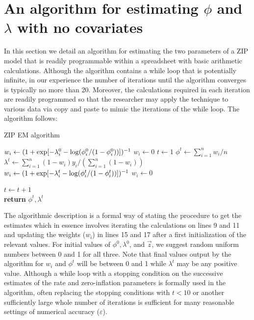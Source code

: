 \documentclass{article}
\begin{document}
\section{An algorithm for estimating $\phi$ and $\lambda$ with no covariates}\label{sec:algo}

In this section we detail an algorithm for estimating the two parameters of a ZIP model that is readily programmable within a spreadsheet with basic arithmetic calculations. Although the algorithm contains a while loop that is potentially infinite, in our experience the number of iterations until the algorithm converges is typically no more than 20. Moreover, the calculations required in each iteration are readily programmed so that the researcher may apply the technique to various data via copy and paste to mimic the iterations of the while loop. The algorithm follows: 

\begin{algorithm}
\caption{ZIP EM algorithm}\label{alg:zip_em}
\begin{algorithmic}[1]
  		\State $w_i \gets (1+\exp[-\lambda_i^0 -\textnormal{log}(\phi_i^0/(1-\phi_i^0))])^{-1}$ 
	\Else 
  		\State $w_i \gets 0$ 
 	\EndIf
\EndFor
\State $t \gets 1$
\State $\phi^t \gets \sum_{i=1}^nw_i/n $\\
\State $\lambda^t \gets \sum_{i=1}^n(1-w_i)y_i /\left(\sum_{i=1}^n(1-w_i)\right) $\\
  		\State $w_i \gets (1+\exp[-\lambda_i^t -\textnormal{log}(\phi_i^t/(1-\phi_i^t))])^{-1}$ 
	\Else 
  		\State $w_i \gets 0$ 
 	\EndIf
\EndFor

\State $t\gets t+1$\\
\EndWhile
\State \textbf{return} $\phi^t, \lambda^t$\\
\EndProcedure
\end{algorithmic}
\end{algorithm}
The algorithmic description is a formal way of stating the procedure to get the estimates which in essence involves iterating the calculations on lines 9 and 11 and updating the weights ($w_i$) in lines 15 and 17 after a first initialization of the relevant values. For initial values of $\phi^0, \lambda^0$, and $\vec{z}$, we suggest random uniform numbers between 0 and 1 for all three. Note that final values output by the algorithm for $w_i$ and $\phi^t$ will be between 0 and 1 while $\lambda^t$ may be any positive value. Although a while loop with a stopping condition on the successive estimates of the rate and zero-inflation parameters is formally used in the algorithm, often replacing the stopping conditions with $t<10$ or another sufficiently large whole number of iterations is sufficient for many reasonable settings of numerical accuracy ($\varepsilon$). 
\end{document}
